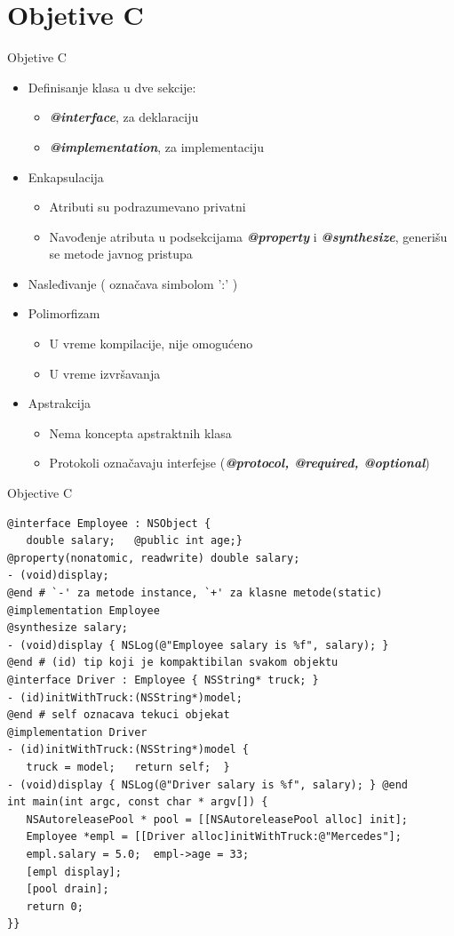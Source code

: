 \documentclass[14pt,aspectratio=169]{beamer}
\begin{document}
\section{Objetive C}
\begin{frame}[fragile]{Objetive C}
\begin{itemize}
\item Definisanje klasa u dve sekcije:
	\begin{itemize}
		\item {\em\textbf{@interface}}, za deklaraciju
		\item {\em\textbf{@implementation}}, za implementaciju
	\end{itemize}
\item Enkapsulacija
	\begin{itemize}
		\item Atributi su podrazumevano privatni
		\item Navođenje atributa u podsekcijama {\em\textbf{@property}} i {\em\textbf{@synthesize}}, generišu se metode javnog pristupa
	\end{itemize}
\item Nasleđivanje ( označava simbolom ':' )
\item Polimorfizam
	\begin{itemize}
		\item U vreme kompilacije, nije omogućeno
		\item U vreme izvršavanja
	\end{itemize}
\item Apstrakcija
	\begin{itemize}
		\item Nema koncepta apstraktnih klasa
		\item Protokoli označavaju interfejse ({\em\textbf{@protocol, @required, @optional}})
	\end{itemize}
\end{itemize}
\end{frame}

\begin{frame}[fragile]{Objective C}
\begin{lstlisting}[caption={Primer koda u Objective C jeziku},frame=single, label=ObjectiveC]
@interface Employee : NSObject {
   double salary;	@public int age;}
@property(nonatomic, readwrite) double salary; 
- (void)display;
@end # `-' za metode instance, `+' za klasne metode(static)
@implementation Employee
@synthesize salary; 
- (void)display { NSLog(@"Employee salary is %f", salary); }
@end # (id) tip koji je kompaktibilan svakom objektu
@interface Driver : Employee { NSString* truck; }
- (id)initWithTruck:(NSString*)model;
@end # self oznacava tekuci objekat
@implementation Driver
- (id)initWithTruck:(NSString*)model {
   truck = model;	return self;  }
- (void)display { NSLog(@"Driver salary is %f", salary); } @end
int main(int argc, const char * argv[]) {
   NSAutoreleasePool * pool = [[NSAutoreleasePool alloc] init];
   Employee *empl = [[Driver alloc]initWithTruck:@"Mercedes"];
   empl.salary = 5.0;  empl->age = 33;
   [empl display];
   [pool drain];
   return 0;
}}
\end{lstlisting}
\end{frame}
\end{document}
